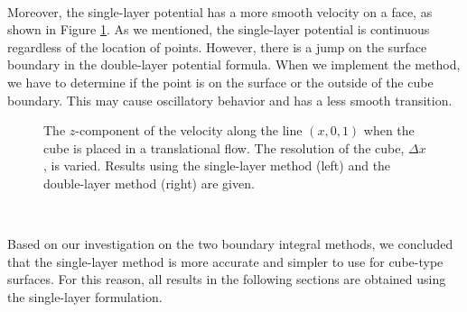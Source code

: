 %
\\
\par
Moreover, the single-layer potential has a more smooth velocity on a face, as shown in Figure \ref{fig_cross_section}. As we mentioned, the single-layer potential is continuous regardless of the location of points. However, there is a jump on the surface boundary in the double-layer potential formula. When we implement the method, we have to determine if the point is on the surface or the outside of the cube boundary. This may cause oscillatory behavior and has a less smooth transition.
\begin{figure}[ht]
	\begin{center}
		
		
		\vspace{0.1cm}
	\end{center}
	\caption{The $z$-component of the velocity along the line $(x,0,1)$ when the cube is placed in a translational flow. The resolution of the cube, $\Delta x$, is varied. Results using the single-layer method (left) and the double-layer method (right) are given. }
	\label{fig_cross_section}
\end{figure}
\\
\par
Based on our investigation on the two boundary integral methods, we concluded that the single-layer method is more accurate and simpler to use for cube-type surfaces.
For this reason, all results in the following sections are obtained using the single-layer formulation. 

